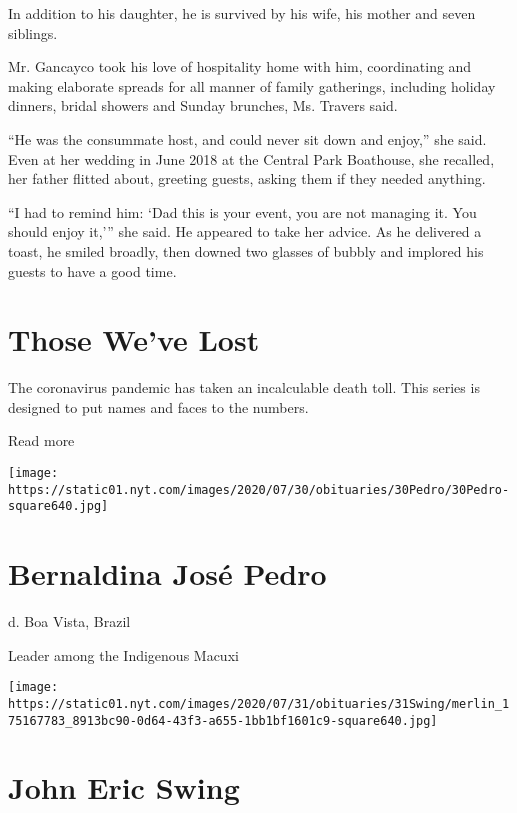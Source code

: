 In addition to his daughter, he is survived by his wife, his mother and
seven siblings.

Mr. Gancayco took his love of hospitality home with him, coordinating
and making elaborate spreads for all manner of family gatherings,
including holiday dinners, bridal showers and Sunday brunches, Ms.
Travers said.

``He was the consummate host, and could never sit down and enjoy,'' she
said. Even at her wedding in June 2018 at the Central Park Boathouse,
she recalled, her father flitted about, greeting guests, asking them if
they needed anything.

``I had to remind him: `Dad this is your event, you are not managing it.
You should enjoy it,''' she said. He appeared to take her advice. As he
delivered a toast, he smiled broadly, then downed two glasses of bubbly
and implored his guests to have a good time.

\href{https://www.nytimes.com/interactive/2020/obituaries/people-died-coronavirus-obituaries.html?action=click\&pgtype=Article\&state=default\&region=BELOW_MAIN_CONTENT\&context=covid_obits_promo}{}

\hypertarget{those-weve-lost}{%
\section{Those We've Lost}\label{those-weve-lost}}

The coronavirus pandemic has taken an incalculable death toll. This
series is designed to put names and faces to the numbers.

Read more

\texttt{[image: https://static01.nyt.com/images/2020/07/30/obituaries/30Pedro/30Pedro-square640.jpg]}

\hypertarget{bernaldina-josuxe9-pedro}{%
\section{Bernaldina José Pedro}\label{bernaldina-josuxe9-pedro}}

d. Boa Vista, Brazil

Leader among the Indigenous Macuxi

\texttt{[image: https://static01.nyt.com/images/2020/07/31/obituaries/31Swing/merlin\_175167783\_8913bc90-0d64-43f3-a655-1bb1bf1601c9-square640.jpg]}

\hypertarget{john-eric-swing}{%
\section{John Eric Swing}\label{john-eric-swing}}

